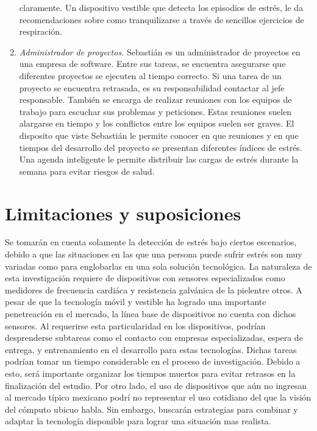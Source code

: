 \documentclass[letterpaper,12pt]{cicese}
\begin{document}
\begin{enumerate}
						claramente. Un dispositivo vestible que detecta los episodios de estr\'es, le da recomendaciones sobre como tranquilizarse a trav\'es de
						sencillos ejercicios de respiraci\'on.
					\item \emph{Administrador de proyectos.}
						Sebasti\'an es un administrador de proyectos en una empresa de software. Entre sus tareas, se encuentra asegurarse que diferentes proyectos
						se ejecuten al tiempo correcto. Si una tarea de un proyecto se encuentra retrasada, es su responsabilidad contactar al jefe responsable.
						Tambi\'en se encarga de realizar reuniones con los equipos de trabajo para escuchar sus problemas y peticiones. Estas reuniones suelen
						alargarse en tiempo y los conflictos entre los equipos suelen ser graves. El disposito que viste Sebasti\'an le permite conocer en que
						reuniones y en que tiempos del desarrollo del proyecto se presentan diferentes \'indices de estr\'es. Una agenda inteligente le permite
						distribuir las cargas de estr\'es durante la semana para evitar riesgos de salud.
				\end{enumerate}
		\chapter{Limitaciones y suposiciones}
			Se tomar\'an en cuenta solamente la detecci\'on de estr\'es bajo ciertos escenarios, debido a que las situaciones en las que una persona puede sufrir estr\'es son muy variadas como para englobarlas en una sola soluci\'on tecnol\'ogica.
			La naturaleza de esta investigaci\'on requiere de dispositivos con sensores especializados como medidores de frecuencia cardi\'aca y resistencia galv\'anica de la pielentre otros. A pesar de que la tecnolog\'ia m\'ovil y vestible ha logrado una importante penetreaci\'on en el mercado, la l\'inea base de dispositivos no cuenta con dichos sensores. Al requerirse esta particularidad en los dispositivos, podr\'ian desprenderse subtareas como el contacto con empresas especializadas, espera de entrega, y entrenamiento en el desarrollo para estas tecnolog\'ias. Dichas tareas podr\'ian tomar un tiempo considerable en el proceso de investigaci\'on. Debido a esto, ser\'a importante organizar los tiempos muertos para evitar retrasos en la finalizaci\'on del estudio.
			Por otro lado, el uso de dispositivos que a\'un no ingresan al mercado t\'ipico mexicano podr\'i no representar el uso cotidiano del que la visi\'on del  c\'omputo ubicuo habla. Sin embargo, buscar\'an estrategias para combinar y adaptar la tecnolog\'ia disponible para lograr una situaci\'on mas realista.
\end{document}

